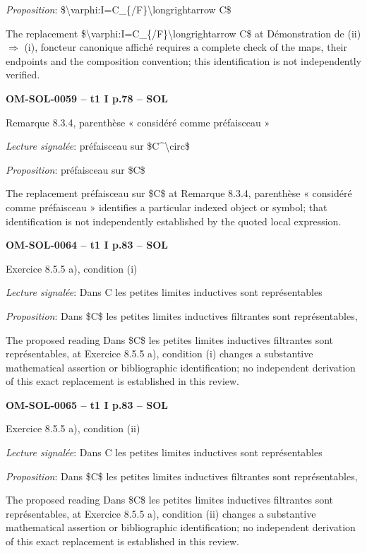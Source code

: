 \emph{Proposition}: \$\textbackslash{}varphi:I=\allowbreak C\_\{/F\}\textbackslash{}longrightarrow C\$\par
The replacement \$\textbackslash{}varphi:I=\allowbreak C\_\{/F\}\textbackslash{}longrightarrow C\$ at Démonstration de (ii) \ensuremath{\Rightarrow} (i), foncteur canonique affiché requires a complete check of the maps, their endpoints and the composition convention; this identification is not independently verified.\par
\par\noindent\textbf{OM-SOL-0059 -- t1 I p.78 -- SOL}\par
Remarque 8.3.4, parenthèse « considéré comme préfaisceau »\par
\emph{Lecture signalée}: préfaisceau sur \$C\textasciicircum{}\textbackslash{}circ\$\par
\emph{Proposition}: préfaisceau sur \$C\$\par
The replacement préfaisceau sur \$C\$ at Remarque 8.3.4, parenthèse « considéré comme préfaisceau » identifies a particular indexed object or symbol; that identification is not independently established by the quoted local expression.\par
\par\noindent\textbf{OM-SOL-0064 -- t1 I p.83 -- SOL}\par
Exercice 8.5.5 a), condition (i)\par
\emph{Lecture signalée}: Dans C les petites limites inductives sont représentables\par
\emph{Proposition}: Dans \$C\$ les petites limites inductives filtrantes sont représentables,\par
The proposed reading Dans \$C\$ les petites limites inductives filtrantes sont représentables, at Exercice 8.5.5 a), condition (i) changes a substantive mathematical assertion or bibliographic identification; no independent derivation of this exact replacement is established in this review.\par
\par\noindent\textbf{OM-SOL-0065 -- t1 I p.83 -- SOL}\par
Exercice 8.5.5 a), condition (ii)\par
\emph{Lecture signalée}: Dans C les petites limites inductives sont représentables\par
\emph{Proposition}: Dans \$C\$ les petites limites inductives filtrantes sont représentables,\par
The proposed reading Dans \$C\$ les petites limites inductives filtrantes sont représentables, at Exercice 8.5.5 a), condition (ii) changes a substantive mathematical assertion or bibliographic identification; no independent derivation of this exact replacement is established in this review.\par
